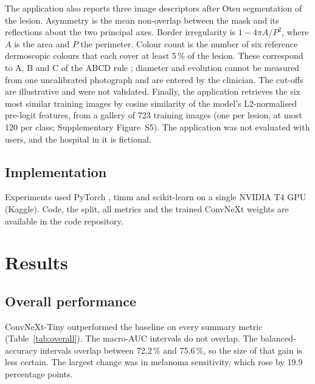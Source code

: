 \documentclass[11pt,a4paper]{article}
\newcommand{\pct}{\,\%}
\begin{document}
The application also reports three image descriptors after Otsu segmentation \cite{otsu1979} of the lesion. Asymmetry is the mean non-overlap between the mask and its reflections about the two principal axes. Border irregularity is $1-4\pi A/P^2$, where $A$ is the area and $P$ the perimeter. Colour count is the number of six reference dermoscopic colours that each cover at least 5\pct{} of the lesion. These correspond to A, B and C of the ABCD rule \cite{nachbar1994,abbasi2004}; diameter and evolution cannot be measured from one uncalibrated photograph and are entered by the clinician. The cut-offs are illustrative and were not validated. Finally, the application retrieves the six most similar training images by cosine similarity of the model's L2-normalised pre-logit features, from a gallery of 723 training images (one per lesion, at most 120 per class; Supplementary Figure~S5). The application was not evaluated with users, and the hospital in it is fictional.

\subsection{Implementation}
Experiments used PyTorch \cite{paszke2019}, timm \cite{wightman2019} and scikit-learn \cite{pedregosa2011} on a single NVIDIA T4 GPU (Kaggle). Code, the split, all metrics and the trained ConvNeXt weights are available in the code repository.

\section{Results}
\subsection{Overall performance}
ConvNeXt-Tiny outperformed the baseline on every summary metric (Table~\ref{tab:overall}). The macro-AUC intervals do not overlap. The balanced-accuracy intervals overlap between 72.2\pct{} and 75.6\pct, so the size of that gain is less certain. The largest change was in melanoma sensitivity, which rose by 19.9 percentage points.
\end{document}
